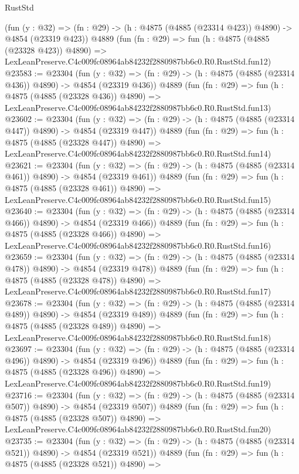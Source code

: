 \begin{lexlean}{RustStd}
\begin{coremodule}
    (fun (y : @32) => (fn : @29) -> (h : @4875 (@4885 (@23314 @423)) @4890) -> @4854 (@23319 @423))
    @4889
    (fun (fn : @29) =>
    fun (h : @4875 (@4885 (@23328 @423)) @4890) =>
    LexLeanPreserve.C4c009fc08964ab84232f2880987bb6c0.R0.RustStd.fun12)
@23583 := @23304
    (fun (y : @32) => (fn : @29) -> (h : @4875 (@4885 (@23314 @436)) @4890) -> @4854 (@23319 @436))
    @4889
    (fun (fn : @29) =>
    fun (h : @4875 (@4885 (@23328 @436)) @4890) =>
    LexLeanPreserve.C4c009fc08964ab84232f2880987bb6c0.R0.RustStd.fun13)
@23602 := @23304
    (fun (y : @32) => (fn : @29) -> (h : @4875 (@4885 (@23314 @447)) @4890) -> @4854 (@23319 @447))
    @4889
    (fun (fn : @29) =>
    fun (h : @4875 (@4885 (@23328 @447)) @4890) =>
    LexLeanPreserve.C4c009fc08964ab84232f2880987bb6c0.R0.RustStd.fun14)
@23621 := @23304
    (fun (y : @32) => (fn : @29) -> (h : @4875 (@4885 (@23314 @461)) @4890) -> @4854 (@23319 @461))
    @4889
    (fun (fn : @29) =>
    fun (h : @4875 (@4885 (@23328 @461)) @4890) =>
    LexLeanPreserve.C4c009fc08964ab84232f2880987bb6c0.R0.RustStd.fun15)
@23640 := @23304
    (fun (y : @32) => (fn : @29) -> (h : @4875 (@4885 (@23314 @466)) @4890) -> @4854 (@23319 @466))
    @4889
    (fun (fn : @29) =>
    fun (h : @4875 (@4885 (@23328 @466)) @4890) =>
    LexLeanPreserve.C4c009fc08964ab84232f2880987bb6c0.R0.RustStd.fun16)
@23659 := @23304
    (fun (y : @32) => (fn : @29) -> (h : @4875 (@4885 (@23314 @478)) @4890) -> @4854 (@23319 @478))
    @4889
    (fun (fn : @29) =>
    fun (h : @4875 (@4885 (@23328 @478)) @4890) =>
    LexLeanPreserve.C4c009fc08964ab84232f2880987bb6c0.R0.RustStd.fun17)
@23678 := @23304
    (fun (y : @32) => (fn : @29) -> (h : @4875 (@4885 (@23314 @489)) @4890) -> @4854 (@23319 @489))
    @4889
    (fun (fn : @29) =>
    fun (h : @4875 (@4885 (@23328 @489)) @4890) =>
    LexLeanPreserve.C4c009fc08964ab84232f2880987bb6c0.R0.RustStd.fun18)
@23697 := @23304
    (fun (y : @32) => (fn : @29) -> (h : @4875 (@4885 (@23314 @496)) @4890) -> @4854 (@23319 @496))
    @4889
    (fun (fn : @29) =>
    fun (h : @4875 (@4885 (@23328 @496)) @4890) =>
    LexLeanPreserve.C4c009fc08964ab84232f2880987bb6c0.R0.RustStd.fun19)
@23716 := @23304
    (fun (y : @32) => (fn : @29) -> (h : @4875 (@4885 (@23314 @507)) @4890) -> @4854 (@23319 @507))
    @4889
    (fun (fn : @29) =>
    fun (h : @4875 (@4885 (@23328 @507)) @4890) =>
    LexLeanPreserve.C4c009fc08964ab84232f2880987bb6c0.R0.RustStd.fun20)
@23735 := @23304
    (fun (y : @32) => (fn : @29) -> (h : @4875 (@4885 (@23314 @521)) @4890) -> @4854 (@23319 @521))
    @4889
    (fun (fn : @29) =>
    fun (h : @4875 (@4885 (@23328 @521)) @4890) =>

\end{coremodule}
\end{lexlean}
